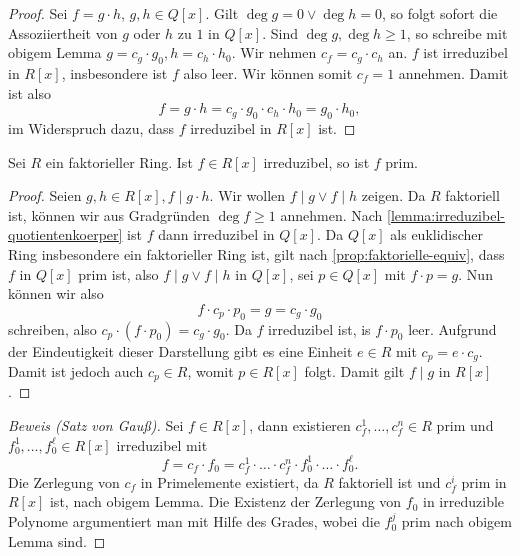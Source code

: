 \begin{proof}
    Sei $f = g \cdot h$, $g, h \in Q[x]$. Gilt $\deg g = 0 \lor \deg h = 0$, so folgt sofort die Assoziiertheit von $g$ oder $h$ zu $1$ in $Q[x]$. Sind $\deg g, \deg h \geq 1$, so schreibe mit obigem Lemma $g = c_g \cdot g_0, h = c_h \cdot h_0$. Wir nehmen \obda $c_f = c_g \cdot c_h$ an. $f$ ist irreduzibel in $R[x]$, insbesondere ist $f$ also leer. Wir können somit \obda $c_f = 1$ annehmen. Damit ist also
    $$ f = g \cdot h = c_g \cdot g_0 \cdot c_h \cdot h_0 = g_0 \cdot h_0, $$
    im Widerspruch dazu, dass $f$ irreduzibel in $R[x]$ ist.
\end{proof}

\begin{lemma}
    Sei $R$ ein faktorieller Ring. Ist $f \in R[x]$ irreduzibel, so ist $f$ prim.
\end{lemma}

\begin{proof}
    Seien $g, h \in R[x], f \mid g \cdot h$. Wir wollen $f \mid g \lor f \mid h$ zeigen. Da $R$ faktoriell ist, können wir aus Gradgründen \obda $\deg f\geq 1$ annehmen. Nach \cref{lemma:irreduzibel-quotientenkoerper} ist $f$ dann irreduzibel in $Q[x]$. Da $Q[x]$ als euklidischer Ring insbesondere ein faktorieller Ring ist, gilt nach \cref{prop:faktorielle-equiv}, dass $f$ in $Q[x]$ prim ist, also $f\mid g \lor f\mid h$ in $Q[x]$, \obda sei $p \in Q[x]$ mit $f \cdot p = g$. Nun können wir also
    $$ f \cdot c_p \cdot p_0 = g = c_g \cdot g_0 $$
    schreiben, also $c_p \cdot (f \cdot p_0) = c_g \cdot g_0$. Da $f$ irreduzibel ist, is $f\cdot p_0$ leer. Aufgrund der Eindeutigkeit dieser Darstellung gibt es eine Einheit $e \in R$ mit $c_p = e \cdot c_g$. Damit ist jedoch auch $c_p \in R$, womit $p \in R[x]$ folgt. Damit gilt $f \mid g$ in $R[x]$.
\end{proof}

\begin{proof}[Beweis (Satz von Gauß)]
    Sei $f \in R[x]$, dann existieren $c_f^1,\ldots,c_f^n\in R$ prim und $f_0^1,\ldots,f_0^\ell\in R[x]$ irreduzibel mit 
    $$ f = c_f \cdot f_0 = c_f^1 \cdot \hdots \cdot c_f^n \cdot f_0^1 \cdot \hdots \cdot f_0^\ell. $$
    Die Zerlegung von $c_f$ in Primelemente existiert, da $R$ faktoriell ist und $c_f^i$ prim in $R[x]$ ist, nach obigem Lemma. Die Existenz der Zerlegung von $f_0$ in irreduzible Polynome argumentiert man mit Hilfe des Grades, wobei die $f_0^j$ prim nach obigem Lemma sind.
\end{proof}